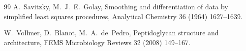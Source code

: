 \documentclass[11pt,a4paper]{article}
\begin{document}
\begin{thebibliography}{99}
A.~Savitzky, M.~J.~E.~Golay,
Smoothing and differentiation of data by simplified least squares procedures,
Analytical Chemistry 36 (1964) 1627--1639.

W.~Vollmer, D.~Blanot, M.~A.~de~Pedro,
Peptidoglycan structure and architecture,
FEMS Microbiology Reviews 32 (2008) 149--167.


\end{thebibliography}
\end{document}
